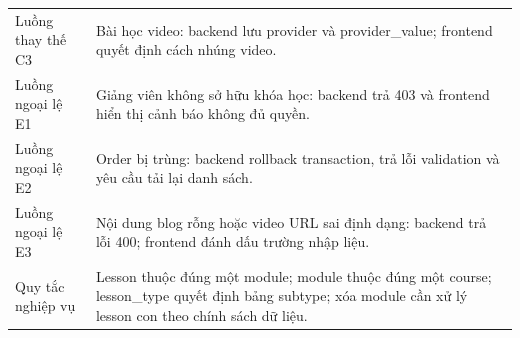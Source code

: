 \documentclass[12pt,a4paper]{report}
\begin{document}
\begin{longtable}{L{4cm} L{10.5cm}}
Luồng thay thế C3 & Bài học video: backend lưu provider và provider\_value; frontend quyết định cách nhúng video. \\
Luồng ngoại lệ E1 & Giảng viên không sở hữu khóa học: backend trả 403 và frontend hiển thị cảnh báo không đủ quyền. \\
Luồng ngoại lệ E2 & Order bị trùng: backend rollback transaction, trả lỗi validation và yêu cầu tải lại danh sách. \\
Luồng ngoại lệ E3 & Nội dung blog rỗng hoặc video URL sai định dạng: backend trả lỗi 400; frontend đánh dấu trường nhập liệu. \\
Quy tắc nghiệp vụ & Lesson thuộc đúng một module; module thuộc đúng một course; lesson\_type quyết định bảng subtype; xóa module cần xử lý lesson con theo chính sách dữ liệu. \\
\bottomrule
\end{longtable}
\end{document}
